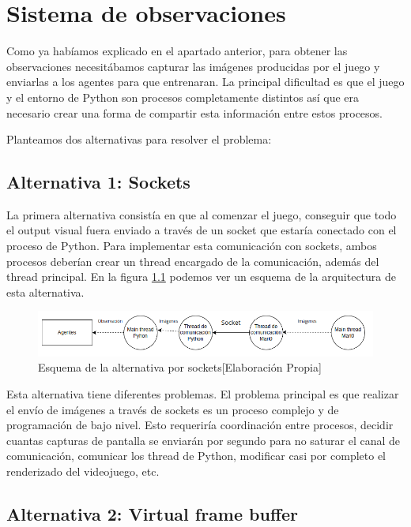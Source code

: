 \chapter{Sistema de observaciones}

Como ya habíamos explicado en el apartado anterior, para obtener las observaciones necesitábamos capturar las imágenes producidas por el juego y enviarlas a los agentes para que entrenaran. La principal dificultad es que el juego y el entorno de Python son procesos completamente distintos así que era necesario crear una forma de compartir esta información entre estos procesos.

Planteamos dos alternativas para resolver el problema:

\section*{Alternativa 1: Sockets}

La primera alternativa consistía en que al comenzar el juego, conseguir que todo el output visual fuera enviado a través de un socket que estaría conectado con el proceso de Python. Para implementar esta comunicación con sockets, ambos procesos deberían crear un thread encargado de la comunicación, además del thread principal. En la figura \ref {fig:alternativa-1-com} podemos ver un esquema de la arquitectura de esta alternativa.

\begin{figure}[ht]
    \centering
    \includegraphics[width=1.0\textwidth]{img/Observations-1.png}
    \caption{Esquema de la alternativa por sockets[Elaboración Propia]}
    \label{fig:alternativa-1-com}
\end{figure}

Esta alternativa tiene diferentes problemas. El problema principal es que realizar el envío de imágenes a través de sockets es un proceso complejo y de programación de bajo nivel. Esto requeriría coordinación entre procesos, decidir cuantas capturas de pantalla se enviarán por segundo para no saturar el canal de comunicación, comunicar los thread de Python, modificar casi por completo el renderizado del videojuego, etc.

\section*{Alternativa 2: Virtual frame buffer}

